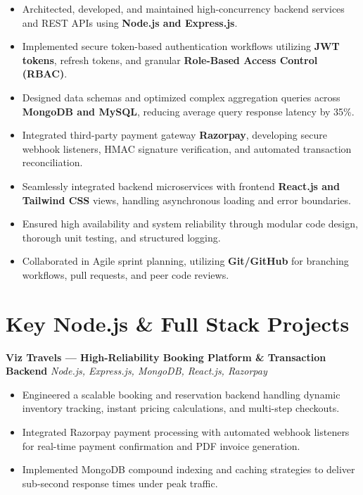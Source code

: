 \documentclass[a4paper,10pt]{article}
\begin{document}
\begin{itemize}

    \item Architected, developed, and maintained high-concurrency backend services and REST APIs using \textbf{Node.js and Express.js}.

    \item Implemented secure token-based authentication workflows utilizing \textbf{JWT tokens}, refresh tokens, and granular \textbf{Role-Based Access Control (RBAC)}.

    \item Designed data schemas and optimized complex aggregation queries across \textbf{MongoDB and MySQL}, reducing average query response latency by 35\%.

    \item Integrated third-party payment gateway \textbf{Razorpay}, developing secure webhook listeners, HMAC signature verification, and automated transaction reconciliation.

    \item Seamlessly integrated backend microservices with frontend \textbf{React.js and Tailwind CSS} views, handling asynchronous loading and error boundaries.

    \item Ensured high availability and system reliability through modular code design, thorough unit testing, and structured logging.

    \item Collaborated in Agile sprint planning, utilizing \textbf{Git/GitHub} for branching workflows, pull requests, and peer code reviews.

\end{itemize}

\section*{Key Node.js \& Full Stack Projects}

\textbf{Viz Travels --- High-Reliability Booking Platform \& Transaction Backend}
\hfill
\textit{Node.js, Express.js, MongoDB, React.js, Razorpay}

\begin{itemize}

    \item Engineered a scalable booking and reservation backend handling dynamic inventory tracking, instant pricing calculations, and multi-step checkouts.

    \item Integrated Razorpay payment processing with automated webhook listeners for real-time payment confirmation and PDF invoice generation.

    \item Implemented MongoDB compound indexing and caching strategies to deliver sub-second response times under peak traffic.

\end{itemize}
\end{document}
